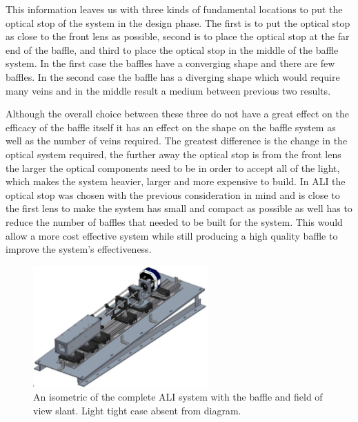 This information leaves us with three kinds of fundamental locations to put the optical stop of the system in the design phase. The first is to put the optical stop as close to the front lens as possible, second is to place the optical stop at the far end of the baffle, and third to place the optical stop in the middle of the baffle system. In the first case the baffles have a  converging shape and there are few baffles. In the second case the baffle has a diverging shape which would require many veins and in the middle result a medium between previous two results.

Although the overall choice between these three do not have a great effect on the efficacy of the baffle itself it has an effect on the shape on the baffle system as well as the number of veins required. The greatest difference is the change in the optical system required, the further away the optical stop is from the front lens the larger the optical components need to be in order to accept all of the light, which makes the system heavier, larger and more expensive to build. In ALI the optical stop was chosen with the previous consideration in mind and is close to the first lens to make the system has small and compact as possible as well has to reduce the number of baffles that needed to be built for the system. This would allow a more cost effective system while still producing a high quality baffle to improve the system's effectiveness.

\begin{figure}[h!]
        \centering
        \includegraphics[width=0.6\textwidth]{./Images/3-3-AliCompleteDesign.pdf}
        \caption[ALI Complete Optical Design (Isometric)]{An isometric of the complete ALI system with the baffle and field of view slant. Light tight case absent from diagram.}
        \label{fig:3.3:aliSystemDiagram}
\end{figure}

